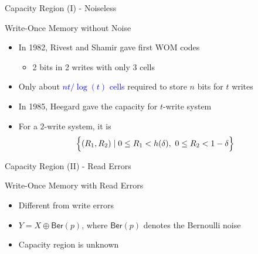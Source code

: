 \documentclass[10pt]{beamer}
\def\WOM_path{../compound-codes/WOM/slides/Figures}
\begin{document}
\begin{frame}{Capacity Region (I) - Noiseless}
  \begin{center}
    \scalebox{0.5}{}    
  \end{center}
  \begin{block}{Write-Once Memory without Noise}
    \begin{itemize}
    \item In 1982, Rivest and Shamir gave first WOM codes 
      \begin{itemize}
      \item 2 bits in 2 writes with only 3 cells
      \end{itemize}
    \item Only about \textcolor{blue}{$n t / \log(t)$ cells} required to store $n$ bits for $t$ writes
    \item<2-> In 1985, Heegard gave the \alert{capacity} for $t$-write system
    \item<2-> For a $2$-write system, it is
      \begin{align*}
        & \Big{\{} (R_1,R_2) \mid 0 \leq R_1 <  h(\delta) , \,\,0 \leq R_2 < 1-\delta \Big{\}} 
      \end{align*}
    \end{itemize}
  \end{block}
\end{frame}

\begin{frame}{Capacity Region (II) - Read Errors}
  \begin{center}
    \scalebox{0.5}{}
  \end{center}
  \begin{block}{Write-Once Memory with Read Errors}
    \begin{itemize}
    \item Different from write errors
    \item $Y = X \oplus \mathsf{Ber}(p)$, where $\mathsf{Ber}(p)$ denotes the Bernoulli noise
    \item Capacity region is \alert{unknown}
    \end{itemize}
  \end{block}
\end{frame}
\end{document}
